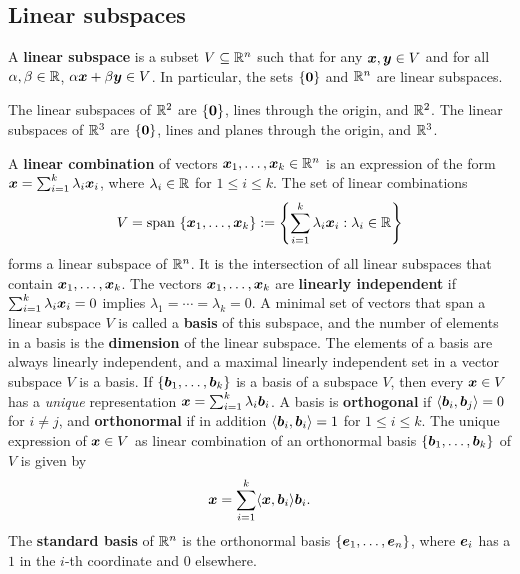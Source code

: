 \documentclass[11pt,a4paper]{memoir}
\begin{document}
\subsection{Linear subspaces}
A \textbf{linear subspace} is a subset $V\subseteq \mathbb{R}^n$ such that for any $\bm{x},\bm{y}\in V$ and for all $\alpha,\beta\in \mathbb{R}$, $\alpha \bm{x}+\beta \bm{y}\in V$. In particular, the sets $\{\bm{0}\}$ and $\mathbb{R}^n$ are linear subspaces. 

\begin{example}
The linear subspaces of $\mathbb{R}^2$ are $\{\bm{0}\}$, lines through the origin, and $\mathbb{R}^2$. The linear subspaces of $\mathbb{R}^3$ are $\{\bm{0}\}$, lines and planes through the origin, and $\mathbb{R}^3$.
\end{example}

A \textbf{linear combination} of vectors $\bm{x}_1,\dots,\bm{x}_k\in \mathbb{R}^n$ 
is an expression of the form $\bm{x}=\sum_{i=1}^k \lambda_i \bm{x}_i$, where $\lambda_i\in \mathbb{R}$ for $1\leq i\leq k$. The set of linear combinations
\begin{equation*}
 V = \mathrm{span}\ \{\bm{x}_1,\dots,\bm{x}_k\} := \left\{\sum_{i=1}^k \lambda_i \bm{x}_i \mathrel{\mathop{:}} \lambda_i\in \mathbb{R}\right\}
\end{equation*}
forms a linear subspace of $\mathbb{R}^n$. It is the intersection of all linear subspaces that contain $\bm{x}_1,\dots,\bm{x}_k$. 
The vectors $\bm{x}_1,\dots,\bm{x}_k$ are \textbf{linearly independent} if $\sum_{i=1}^k \lambda_i\bm{x}_i=0$ implies $\lambda_1=\cdots=\lambda_k=0$. A minimal set of vectors that span a linear subspace $V$ is called
a \textbf{basis} of this subspace, and the number of elements in a basis is the \textbf{dimension} of the linear subspace. The elements of a basis are always linearly independent, and a maximal linearly independent set in a vector subspace $V$ is a basis.
If $\{\bm{b}_1,\dots,\bm{b}_k\}$ is a basis of a subspace $V$, then every $\bm{x}\in V$ has a {\em unique} representation $\bm{x}=\sum_{i=1}^k \lambda_i \bm{b}_i$.
A basis is \textbf{orthogonal} if $\langle {\bm{b}_i}, {\bm{b}_j} \rangle=0$ for $i\neq j$, and \textbf{orthonormal} if in addition $\langle {\bm{b}_i}, {\bm{b}_i} \rangle=1$ for $1\leq i\leq k$. The unique expression of $\bm{x}\in V$ as linear combination of an orthonormal basis $\{\bm{b}_1,\dots,\bm{b}_k\}$ of $V$ is given by
\begin{equation*}
 \bm{x} = \sum_{i=1}^k \langle {\bm{x}}, {\bm{b}_i} \rangle \bm{b}_i.
\end{equation*}
The \textbf{standard basis} of $\mathbb{R}^n$ is the orthonormal basis $\{\bm{e}_1,\dots,\bm{e}_n\}$, where $\bm{e}_i$ has a $1$ in the $i$-th coordinate and $0$ elsewhere.
\end{document}
